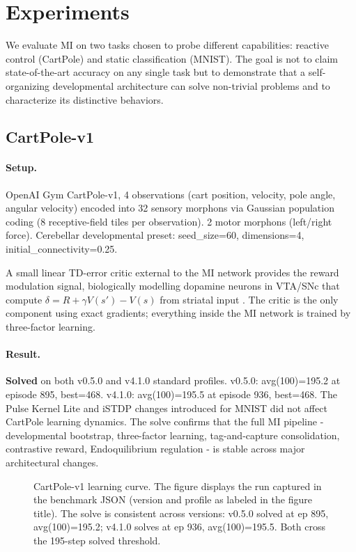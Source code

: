 \section{Experiments}
\label{sec:experiments}

We evaluate MI on two tasks chosen to probe different capabilities: reactive control (CartPole) and static classification (MNIST). The goal is not to claim state-of-the-art accuracy on any single task but to demonstrate that a self-organizing developmental architecture can solve non-trivial problems and to characterize its distinctive behaviors.

\subsection{CartPole-v1}
\label{sec:exp_cartpole}

\paragraph{Setup.}
OpenAI Gym CartPole-v1, 4 observations (cart position, velocity, pole angle, angular velocity) encoded into 32 sensory morphons via Gaussian population coding (8 receptive-field tiles per observation). 2 motor morphons (left/right force). Cerebellar developmental preset: seed\_size=60, dimensions=4, initial\_connectivity=0.25.

A small linear TD-error critic external to the MI network provides the reward modulation signal, biologically modelling dopamine neurons in VTA/SNc that compute $\delta = R + \gamma V(s') - V(s)$ from striatal input \cite{fremaux2013reinforcement}. The critic is the only component using exact gradients; everything inside the MI network is trained by three-factor learning.

\paragraph{Result.}
\textbf{Solved} on both v0.5.0 and v4.1.0 standard profiles. v0.5.0: avg(100)=195.2 at episode 895, best=468. v4.1.0: avg(100)=195.5 at episode 936, best=468. The Pulse Kernel Lite and iSTDP changes introduced for MNIST did not affect CartPole learning dynamics. The solve confirms that the full MI pipeline - developmental bootstrap, three-factor learning, tag-and-capture consolidation, contrastive reward, Endoquilibrium regulation - is stable across major architectural changes.

\begin{figure}[h]
  \centering
  \caption{CartPole-v1 learning curve. The figure displays the run captured in the benchmark JSON (version and profile as labeled in the figure title). The solve is consistent across versions: v0.5.0 solved at ep 895, avg(100)=195.2; v4.1.0 solves at ep 936, avg(100)=195.5. Both cross the 195-step solved threshold.}
  \label{fig:cartpole}
\end{figure}

